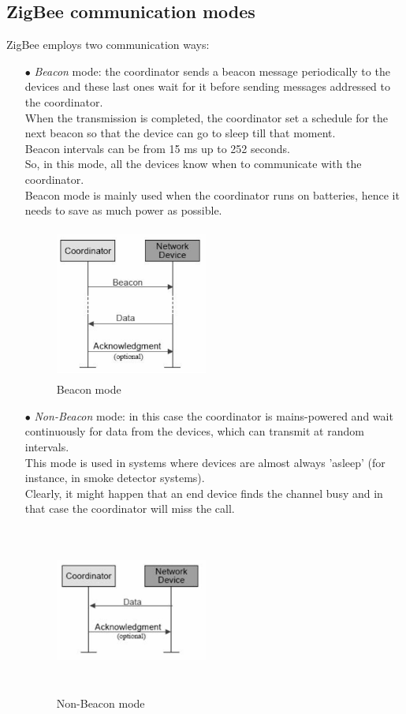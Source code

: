 \documentclass[12pt]{report}
\begin{document}
{{\subsection{ZigBee communication modes}
\bigskip
ZigBee employs two communication ways:
\bigskip
\begin{itemize}
\setlength{\itemindent}{+4mm}
\item[$\bullet$] \emph{Beacon} mode: the coordinator sends a beacon message periodically to the devices and these last ones wait for it before sending messages addressed to the coordinator.\\
When the transmission is completed, the coordinator set a schedule for the next beacon so that the device can go to sleep till that moment.\\
Beacon intervals can be from 15 ms up to 252 seconds.\\
So, in this mode, all the devices know when to communicate with the coordinator.\\
Beacon mode is mainly used when the coordinator runs on batteries, hence it needs to save as much power as possible.

\begin{figure}[H]
\includegraphics[width=5cm,height=5cm,keepaspectratio]{zigbee_beaconmode}
\centering
\caption{Beacon mode}
\end{figure}

\item[$\bullet$] \emph{Non-Beacon} mode: in this case the coordinator is mains-powered and wait continuously for data from the devices, which can transmit at random intervals.\\
This mode is used in systems where devices are almost always 'asleep' (for instance, in smoke detector systems).\\
Clearly, it might happen that an end device finds the channel busy and in that case the coordinator will miss the call.

\begin{figure}[H]
\includegraphics[width=5cm,height=5.5cm,keepaspectratio]{zigbee_nonbeaconmode}
\centering
\caption{Non-Beacon mode}
\end{figure}


\end{itemize}}}
\end{document}
